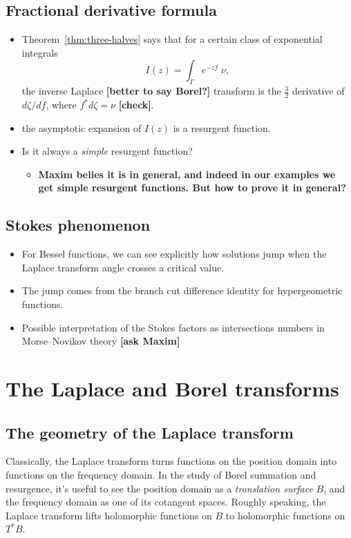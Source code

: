 \documentclass{article}
\begin{document}
\subsection{Fractional derivative formula}
\begin{itemize}
\item Theorem~\ref{thm:three-halves} says that for a certain class of exponential integrals
\[ I(z) = \int_\Gamma e^{-zf}\;\nu, \]
the inverse Laplace \textbf{[better to say Borel?]} transform is the $\tfrac{3}{2}$ derivative of $d\zeta/df$, where $f^* d\zeta = \nu$ \textbf{[check]}.
\item the asymptotic expansion of $I(z)$ is a resurgent function.
\item Is it always a \emph{simple} resurgent function?
\begin{itemize}
\item \textbf{Maxim belies it is in general, and indeed in our examples we get simple resurgent functions. But how to prove it in general?}
\end{itemize} 
\end{itemize}
\subsection{Stokes phenomenon}
\begin{itemize}
\item For Bessel functions, we can see explicitly how solutions jump when the Laplace transform angle crosses a critical value.
\item The jump comes from the branch cut difference identity for hypergeometric functions.
\item Possible interpretation of the Stokes factors as intersections numbers in Morse--Novikov theory \textbf{[ask Maxim]}
\end{itemize}
\section{The Laplace and Borel transforms}
\subsection{The geometry of the Laplace transform}

Classically, the Laplace transform turns functions on the position domain into functions on the frequency domain. In the study of Borel summation and resurgence, it's useful to see the position domain as a {\em translation surface} $B$, and the frequency domain as one of its cotangent spaces. Roughly speaking, the Laplace transform lifts holomorphic functions on $B$ to holomorphic functions on $T^* B$.
\end{document}
